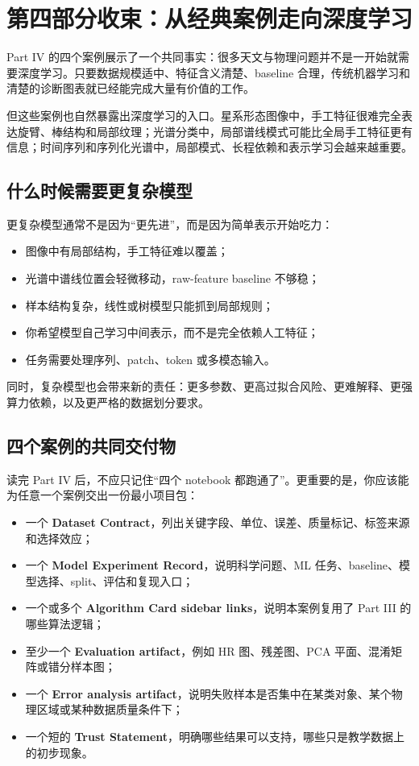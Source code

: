 \chapter*{第四部分收束：从经典案例走向深度学习}

Part IV 的四个案例展示了一个共同事实：很多天文与物理问题并不是一开始就需要深度学习。只要数据规模适中、特征含义清楚、baseline 合理，传统机器学习和清楚的诊断图表就已经能完成大量有价值的工作。

但这些案例也自然暴露出深度学习的入口。星系形态图像中，手工特征很难完全表达旋臂、棒结构和局部纹理；光谱分类中，局部谱线模式可能比全局手工特征更有信息；时间序列和序列化光谱中，局部模式、长程依赖和表示学习会越来越重要。

\section*{什么时候需要更复杂模型}

更复杂模型通常不是因为“更先进”，而是因为简单表示开始吃力：

\begin{itemize}
    \item 图像中有局部结构，手工特征难以覆盖；
    \item 光谱中谱线位置会轻微移动，raw-feature baseline 不够稳；
    \item 样本结构复杂，线性或树模型只能抓到局部规则；
    \item 你希望模型自己学习中间表示，而不是完全依赖人工特征；
    \item 任务需要处理序列、patch、token 或多模态输入。
\end{itemize}

同时，复杂模型也会带来新的责任：更多参数、更高过拟合风险、更难解释、更强算力依赖，以及更严格的数据划分要求。

\section*{四个案例的共同交付物}

读完 Part IV 后，不应只记住“四个 notebook 都跑通了”。更重要的是，你应该能为任意一个案例交出一份最小项目包：

\begin{itemize}
    \item 一个 \textbf{Dataset Contract}，列出关键字段、单位、误差、质量标记、标签来源和选择效应；
    \item 一个 \textbf{Model Experiment Record}，说明科学问题、ML 任务、baseline、模型选择、split、评估和复现入口；
    \item 一个或多个 \textbf{Algorithm Card sidebar links}，说明本案例复用了 Part III 的哪些算法逻辑；
    \item 至少一个 \textbf{Evaluation artifact}，例如 HR 图、残差图、PCA 平面、混淆矩阵或错分样本图；
    \item 一个 \textbf{Error analysis artifact}，说明失败样本是否集中在某类对象、某个物理区域或某种数据质量条件下；
    \item 一个短的 \textbf{Trust Statement}，明确哪些结果可以支持，哪些只是教学数据上的初步现象。
\end{itemize}

